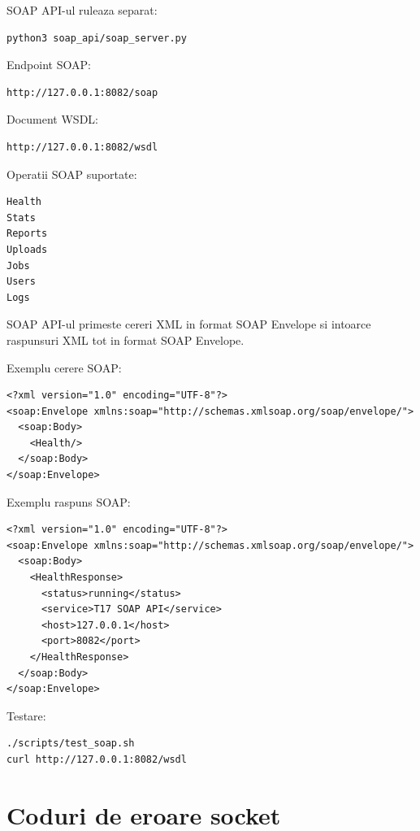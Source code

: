 \documentclass[12pt,a4paper]{article}
\begin{document}
SOAP API-ul ruleaza separat:

\begin{lstlisting}[style=code]
python3 soap_api/soap_server.py
\end{lstlisting}

Endpoint SOAP:

\begin{lstlisting}[style=code]
http://127.0.0.1:8082/soap
\end{lstlisting}

Document WSDL:

\begin{lstlisting}[style=code]
http://127.0.0.1:8082/wsdl
\end{lstlisting}

Operatii SOAP suportate:

\begin{lstlisting}[style=code]
Health
Stats
Reports
Uploads
Jobs
Users
Logs
\end{lstlisting}

SOAP API-ul primeste cereri XML in format SOAP Envelope si intoarce raspunsuri XML tot in format SOAP Envelope.

Exemplu cerere SOAP:

\begin{lstlisting}[style=code]
<?xml version="1.0" encoding="UTF-8"?>
<soap:Envelope xmlns:soap="http://schemas.xmlsoap.org/soap/envelope/">
  <soap:Body>
    <Health/>
  </soap:Body>
</soap:Envelope>
\end{lstlisting}

Exemplu raspuns SOAP:

\begin{lstlisting}[style=code]
<?xml version="1.0" encoding="UTF-8"?>
<soap:Envelope xmlns:soap="http://schemas.xmlsoap.org/soap/envelope/">
  <soap:Body>
    <HealthResponse>
      <status>running</status>
      <service>T17 SOAP API</service>
      <host>127.0.0.1</host>
      <port>8082</port>
    </HealthResponse>
  </soap:Body>
</soap:Envelope>
\end{lstlisting}

Testare:

\begin{lstlisting}[style=code]
./scripts/test_soap.sh
curl http://127.0.0.1:8082/wsdl
\end{lstlisting}

\section{Coduri de eroare socket}
\end{document}
